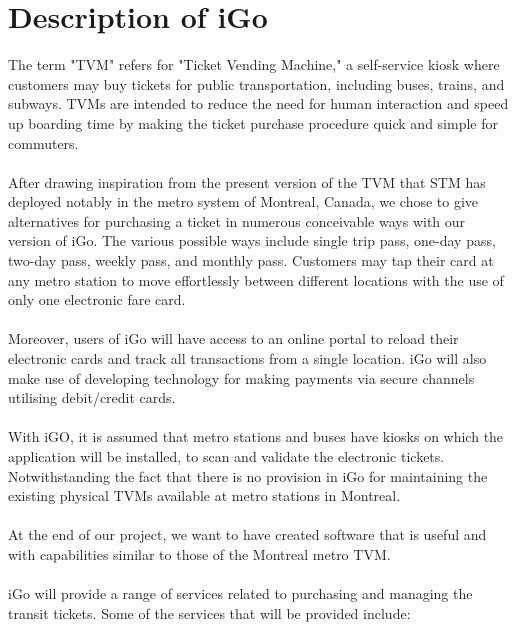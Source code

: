 \documentclass[a4paper, 11pt]{report}
\begin{document}
\section{Description of iGo}
The term "TVM" refers for "Ticket Vending Machine," a self-service kiosk where customers may buy tickets for public transportation, including buses, trains, and subways. TVMs are intended to reduce the need for human interaction and speed up boarding time by making the ticket purchase procedure quick and simple for commuters. \\\\
After drawing inspiration from the present version of the TVM that STM has deployed notably in the metro system of Montreal, Canada, we chose to give alternatives for purchasing a ticket in numerous conceivable ways with our version of iGo. The various possible ways include single trip pass, one-day pass, two-day pass, weekly pass, and monthly pass. Customers may tap their card at any metro station to move effortlessly between different locations with the use of only one electronic fare card. \\\\
Moreover, users of iGo will have access to an online portal to reload their electronic cards and track all transactions from a single location. iGo will also make use of developing technology for making payments via secure channels utilising debit/credit cards.\\\\
With iGO, it is assumed that metro stations and buses have kiosks on which the application will be installed, to scan and validate the electronic tickets. Notwithstanding the fact that there is no provision in iGo for maintaining the existing physical TVMs available at metro stations in Montreal. 
\\\\
At the end of our project, we want to have created software that is useful and with capabilities similar to those of the Montreal metro TVM.  \\\\
iGo will provide a range of services related to purchasing and managing the transit tickets. Some of the services that will be provided include: 
\end{document}

